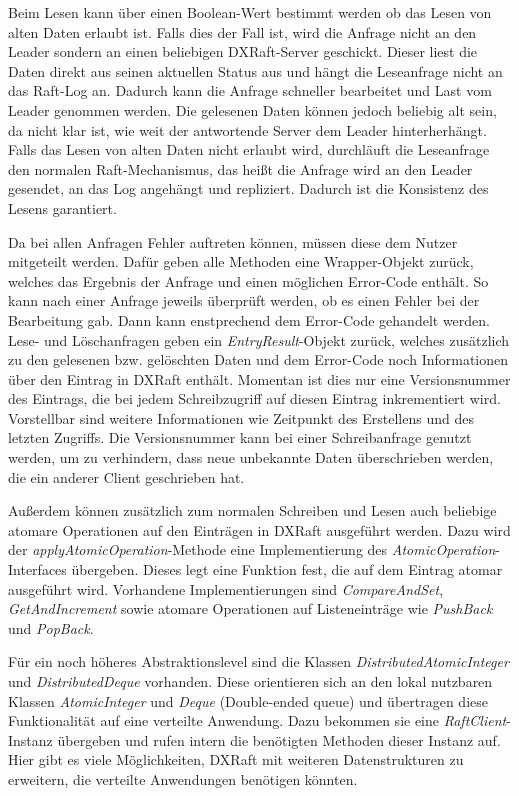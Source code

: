 Beim Lesen kann über einen Boolean-Wert bestimmt werden ob das Lesen von alten Daten erlaubt ist. Falls dies der Fall ist, wird die Anfrage nicht an den Leader sondern an einen beliebigen DXRaft-Server geschickt. Dieser liest die Daten direkt aus seinen aktuellen Status aus und hängt die Leseanfrage nicht an das Raft-Log an. Dadurch kann die Anfrage schneller bearbeitet und Last vom Leader genommen werden. Die gelesenen Daten können jedoch beliebig alt sein, da nicht klar ist, wie weit der antwortende Server dem Leader hinterherhängt. Falls das Lesen von alten Daten nicht erlaubt wird, durchläuft die Leseanfrage den normalen Raft-Mechanismus, das heißt die Anfrage wird an den Leader gesendet, an das Log angehängt und repliziert. Dadurch ist die Konsistenz des Lesens garantiert.

Da bei allen Anfragen Fehler auftreten können, müssen diese dem Nutzer mitgeteilt werden. Dafür geben alle Methoden eine Wrapper-Objekt zurück, welches das Ergebnis der Anfrage und einen möglichen Error-Code enthält. So kann nach einer Anfrage jeweils überprüft werden, ob es einen Fehler bei der Bearbeitung gab. Dann kann enstprechend dem Error-Code gehandelt werden. Lese- und Löschanfragen geben ein \textit{EntryResult}-Objekt zurück, welches zusätzlich zu den gelesenen bzw. gelöschten Daten und dem Error-Code noch Informationen über den Eintrag in DXRaft enthält. Momentan ist dies nur eine Versionsnummer des Eintrags, die bei jedem Schreibzugriff auf diesen Eintrag inkrementiert wird. Vorstellbar sind weitere Informationen wie Zeitpunkt des Erstellens und des letzten Zugriffs. Die Versionsnummer kann bei einer Schreibanfrage genutzt werden, um zu verhindern, dass neue unbekannte Daten überschrieben werden, die ein anderer Client geschrieben hat.

Außerdem können zusätzlich zum normalen Schreiben und Lesen auch beliebige atomare Operationen auf den Einträgen in DXRaft ausgeführt werden. Dazu wird der \textit{applyAtomicOperation}-Methode eine Implementierung des \textit{AtomicOperation}-Interfaces übergeben. Dieses legt eine Funktion fest, die auf dem Eintrag atomar ausgeführt wird. Vorhandene Implementierungen sind \textit{CompareAndSet}, \textit{GetAndIncrement} sowie atomare Operationen auf Listeneinträge wie \textit{PushBack} und \textit{PopBack}.

Für ein noch höheres Abstraktionslevel sind die Klassen \textit{DistributedAtomicInteger} und \textit{DistributedDeque} vorhanden. Diese orientieren sich an den lokal nutzbaren Klassen \textit{AtomicInteger} und \textit{Deque} (Double-ended queue) und übertragen diese Funktionalität auf eine verteilte Anwendung. Dazu bekommen sie eine \textit{RaftClient}-Instanz übergeben und rufen intern die benötigten Methoden dieser Instanz auf. Hier gibt es viele Möglichkeiten, DXRaft mit weiteren Datenstrukturen zu erweitern, die verteilte Anwendungen benötigen könnten.

